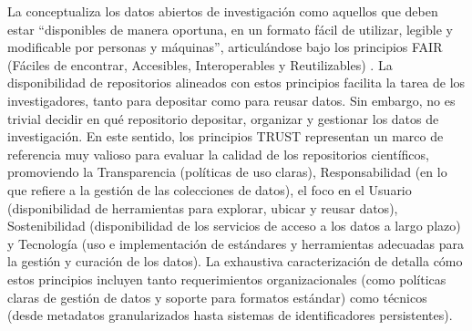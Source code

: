 \documentclass[runningheads]{llncs}
\begin{document}
La \citet[p.~10]{unesco2021} conceptualiza los datos abiertos de investigación como aquellos que deben estar ``disponibles de manera oportuna, en un formato fácil de utilizar, legible y modificable por personas y máquinas'', articulándose bajo los principios FAIR (Fáciles de encontrar, Accesibles, Interoperables y Reutilizables) \citep{wilkinson2016}.  La disponibilidad de repositorios alineados con estos principios facilita la tarea de los investigadores, tanto para depositar como para reusar datos. Sin embargo, no es trivial decidir en qué repositorio depositar, organizar y gestionar los datos de investigación. En este sentido, los principios TRUST \citep{Lin2020TRUST} representan un marco de referencia muy valioso para evaluar la calidad de los repositorios científicos,  promoviendo la Transparencia (políticas de uso claras), Responsabilidad (en lo que refiere a la gestión de las colecciones de datos), el foco en el Usuario (disponibilidad de  herramientas para explorar, ubicar y reusar datos), Sostenibilidad (disponibilidad de los servicios de acceso a los datos  a largo plazo) y Tecnología (uso e implementación de estándares y herramientas adecuadas para la gestión y curación de los datos).
La exhaustiva caracterización de \citep{behnke_2020_5361952} detalla cómo estos principios  incluyen tanto requerimientos organizacionales (como políticas claras de gestión de datos y soporte para formatos estándar) como técnicos (desde metadatos granularizados hasta sistemas de identificadores persistentes).  \\
\end{document}
